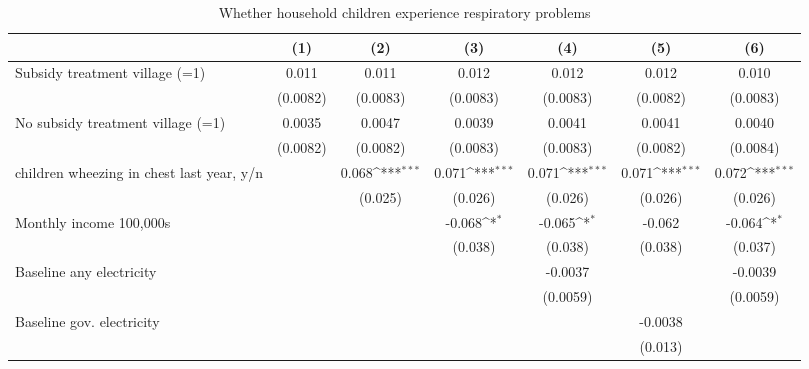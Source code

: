 \begin{table}[htbp]\centering
\def\sym#1{\ifmmode^{#1}\else\(^{#1}\)\fi}
\caption{Whether household children experience respiratory problems}
\begin{tabular*}{1\hsize}{@{\hskip\tabcolsep\extracolsep\fill}l*{6}{c}}
\toprule
                &\multicolumn{1}{c}{(1)}         &\multicolumn{1}{c}{(2)}         &\multicolumn{1}{c}{(3)}         &\multicolumn{1}{c}{(4)}         &\multicolumn{1}{c}{(5)}         &\multicolumn{1}{c}{(6)}         \\
\midrule
Subsidy treatment village (=1)&    0.011         &    0.011         &    0.012         &    0.012         &    0.012         &    0.010         \\
                & (0.0082)         & (0.0083)         & (0.0083)         & (0.0083)         & (0.0082)         & (0.0083)         \\
No subsidy treatment village (=1)&   0.0035         &   0.0047         &   0.0039         &   0.0041         &   0.0041         &   0.0040         \\
                & (0.0082)         & (0.0082)         & (0.0083)         & (0.0083)         & (0.0082)         & (0.0084)         \\
children wheezing in chest last year, y/n&                  &    0.068\sym{***}&    0.071\sym{***}&    0.071\sym{***}&    0.071\sym{***}&    0.072\sym{***}\\
                &                  &  (0.025)         &  (0.026)         &  (0.026)         &  (0.026)         &  (0.026)         \\
Monthly income 100,000s&                  &                  &   -0.068\sym{*}  &   -0.065\sym{*}  &   -0.062         &   -0.064\sym{*}  \\
                &                  &                  &  (0.038)         &  (0.038)         &  (0.038)         &  (0.037)         \\
Baseline any electricity&                  &                  &                  &  -0.0037         &                  &  -0.0039         \\
                &                  &                  &                  & (0.0059)         &                  & (0.0059)         \\
Baseline gov. electricity&                  &                  &                  &                  &  -0.0038         &                  \\
                &                  &                  &                  &                  &  (0.013)         &                  \\

\end{tabular*}
\end{table}
